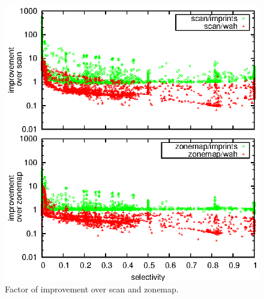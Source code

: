 \begin{figure}
\includegraphics{figs/static/improv}
\caption{Factor of improvement over scan and zonemap.}
\label{fig:impr}
\end{figure}

